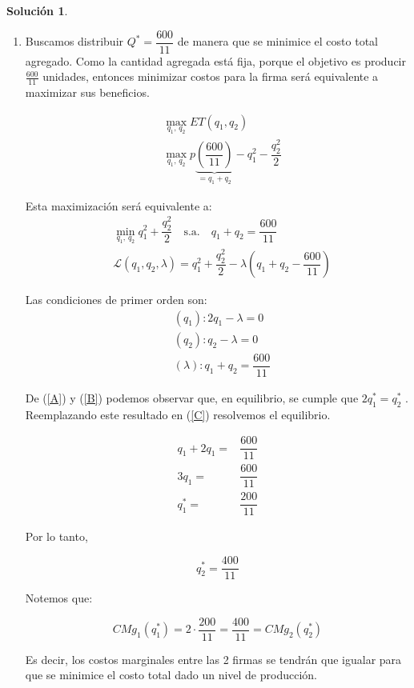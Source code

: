 \documentclass[a4paper, 11pt]{article}
\theoremstyle{definition}
\newtheorem{solucion}{Soluci\'on}
\begin{document}
\begin{solucion}
\begin{enumerate}[label=(\alph*)]
\item Buscamos distribuir $Q^*=\dfrac{600}{11}$ de manera que se minimice el costo total agregado. Como la cantidad agregada está fija, porque el objetivo es producir $\frac{600}{11}$ unidades, entonces minimizar costos para la firma será equivalente a maximizar sus beneficios.

\vspace{-18pt}

\begin{align*}
    &\displaystyle\max_{q_1, \, q_2}  ET(q_1, q_2) \\
    &\displaystyle\max_{q_1 , \, q_2}p \underbrace{\left(\dfrac{600}{11}\right)}_\text{$=q_1+q_2$}-q_1^2-\dfrac{q_2^2}{2}
\end{align*}

\vspace{-18pt}

Esta maximización será equivalente a:
\begin{align*}
&\displaystyle\min_{q_1, \, q_2} q_1^2+\dfrac{q_2^2}{2} \quad \text{s.a.} \quad q_1+q_2=\dfrac{600}{11} \\
&\mathcal{L}(q_1, q_2, \lambda)= q_1^2+\dfrac{q_2^2}{2}-\lambda\left(q_1+q_2-\dfrac{600}{11}\right)
\end{align*}

\vspace*{-18pt}
 
Las condiciones de primer orden son:
\vspace*{-12pt}
\begin{align}
&(q_1): 2q_1-\lambda=0 \label{A}\\
&(q_2):q_2-\lambda=0 \label{B}\\
&(\lambda): q_1+q_2=\dfrac{600}{11} \label{C}
\end{align}

De (\ref{A}) y (\ref{B}) podemos observar que, en equilibrio, se cumple que $2q_1^*=q_2^*$ . Reemplazando este resultado en (\ref{C}) resolvemos el equilibrio.

\vspace{-18pt}

\begin{align*}
q_1+2q_1=&\dfrac{600}{11}\\
3q_1=&\dfrac{600}{11}\\
q_1^*=&\dfrac{200}{11}
\end{align*}

\vspace*{-12pt}

Por lo tanto, 

\vspace*{-12pt}

\[q_2^*=\dfrac{400}{11}\]

Notemos que:

\vspace*{-12pt}
\[CMg_1(q_1^*)=2\cdot\dfrac{200}{11}=\dfrac{400}{11}=CMg_2(q_2^*)\]

Es decir, los costos marginales entre las 2 firmas se tendrán que igualar para que se minimice el costo total dado un nivel de producción.
\end{enumerate}
\end{solucion}
\end{document}
